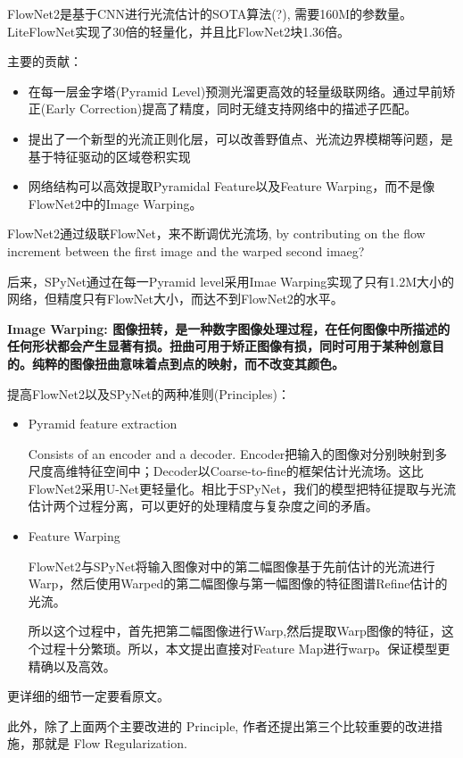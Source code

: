 FlowNet2是基于CNN进行光流估计的SOTA算法(?), 需要160M的参数量。LiteFlowNet实现了30倍的轻量化，并且比FlowNet2块1.36倍。

主要的贡献：
\begin{itemize}
\item 在每一层金字塔(Pyramid Level)预测光溜更高效的轻量级联网络。通过早前矫正(Early Correction)提高了精度，同时无缝支持网络中的描述子匹配。
\item 提出了一个新型的光流正则化层，可以改善野值点、光流边界模糊等问题，是基于特征驱动的区域卷积实现
\item 网络结构可以高效提取Pyramidal Feature以及Feature Warping，而不是像FlowNet2中的Image Warping。
\end{itemize}

FlowNet2通过级联FlowNet，来不断调优光流场, by contributing on the flow increment between the first image and the warped second imaeg?

后来，SPyNet通过在每一Pyramid level采用Imae Warping实现了只有1.2M大小的网络，但精度只有FlowNet大小，而达不到FlowNet2的水平。

{\bfseries Image Warping: 图像扭转，是一种数字图像处理过程，在任何图像中所描述的任何形状都会产生显著有损。扭曲可用于矫正图像有损，同时可用于某种创意目的。纯粹的图像扭曲意味着点到点的映射，而不改变其颜色。}

提高FlowNet2以及SPyNet的两种准则(Principles)：

\begin{itemize}
\item Pyramid feature extraction

Consists of an encoder and a decoder. Encoder把输入的图像对分别映射到多尺度高维特征空间中；Decoder以Coarse-to-fine的框架估计光流场。这比FlowNet2采用U-Net更轻量化。相比于SPyNet，我们的模型把特征提取与光流估计两个过程分离，可以更好的处理精度与复杂度之间的矛盾。

\item Feature Warping

FlowNet2与SPyNet将输入图像对中的第二幅图像基于先前估计的光流进行Warp，然后使用Warped的第二幅图像与第一幅图像的特征图谱Refine估计的光流。

所以这个过程中，首先把第二幅图像进行Warp,然后提取Warp图像的特征，这个过程十分繁琐。所以，本文提出直接对Feature Map进行warp。保证模型更精确以及高效。

\end{itemize}

更详细的细节一定要看原文\cite{Hui2018LiteFlowNet}。

此外，除了上面两个主要改进的 Principle, 作者还提出第三个比较重要的改进措施，那就是 Flow Regularization.


